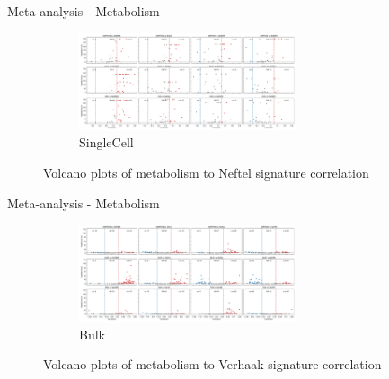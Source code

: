 \documentclass[aspectratio=169,9pt]{beamer}
\begin{document}
    \begin{frame}{Meta-analysis - Metabolism}
        \begin{adjustwidth}{-5cm}{-5cm}
            \centering
            \begin{figure}
                \centering
                \begin{subfigure}[c]{\textwidth}
                    \centering
                    \includegraphics[width=0.7\textwidth]{volcano_SC_Nef_Met}
                    \caption{SingleCell}
                \end{subfigure}
                \caption{Volcano plots of metabolism to Neftel signature correlation}
            \end{figure}
        \end{adjustwidth}
    \end{frame}

    \begin{frame}{Meta-analysis - Metabolism}
        \begin{adjustwidth}{-5cm}{-5cm}
            \centering
            \begin{figure}\ContinuedFloat
                \centering
                \begin{subfigure}[c]{\textwidth}
                    \centering
                    \includegraphics[width=0.7\textwidth]{volcano_Bulk_Ver_Met}
                    \caption{Bulk}
                \end{subfigure}
                \caption{Volcano plots of metabolism to Verhaak signature correlation}
            \end{figure}
        \end{adjustwidth}
    \end{frame}
\end{document}
